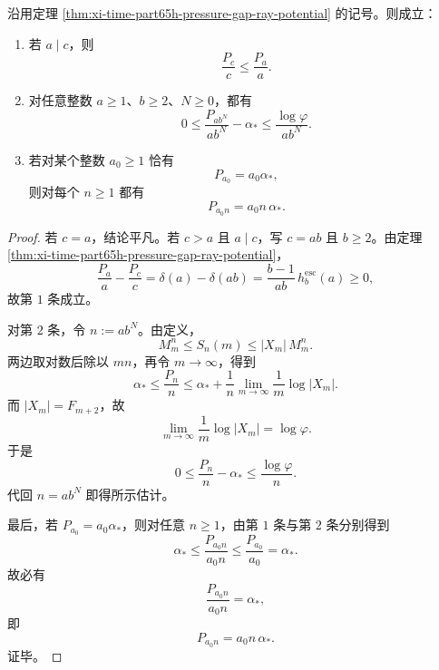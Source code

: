 \begin{corollary}\label{cor:xi-time-part65h-divisibility-slope-freezing-propagation}
沿用定理 \ref{thm:xi-time-part65h-pressure-gap-ray-potential} 的记号。则成立：
\begin{enumerate}
  \item 若 \(a\mid c\)，则
  \[
  \frac{P_c}{c}\le \frac{P_a}{a}.
  \]
  \item 对任意整数 \(a\ge 1\)、\(b\ge 2\)、\(N\ge 0\)，都有
  \[
  0\le \frac{P_{ab^N}}{ab^N}-\alpha_*
  \le \frac{\log\varphi}{ab^N}.
  \]
  \item 若对某个整数 \(a_0\ge 1\) 恰有
  \[
  P_{a_0}=a_0\alpha_*,
  \]
  则对每个 \(n\ge 1\) 都有
  \[
  P_{a_0n}=a_0n\,\alpha_*.
  \]
\end{enumerate}
\end{corollary}
\begin{proof}
若 \(c=a\)，结论平凡。若 \(c>a\) 且 \(a\mid c\)，写 \(c=ab\) 且 \(b\ge 2\)。由定理 \ref{thm:xi-time-part65h-pressure-gap-ray-potential}，
\[
\frac{P_a}{a}-\frac{P_c}{c}
=
\delta(a)-\delta(ab)
=
\frac{b-1}{ab}\,h_b^{\mathrm{esc}}(a)\ge 0,
\]
故第 \(1\) 条成立。

对第 \(2\) 条，令 \(n:=ab^N\)。由定义，
\[
M_m^n\le S_n(m)\le |X_m|\,M_m^n.
\]
两边取对数后除以 \(mn\)，再令 \(m\to\infty\)，得到
\[
\alpha_*\le \frac{P_n}{n}\le \alpha_*+\frac{1}{n}\lim_{m\to\infty}\frac1m\log|X_m|.
\]
而 \(|X_m|=F_{m+2}\)，故
\[
\lim_{m\to\infty}\frac1m\log|X_m|=\log\varphi.
\]
于是
\[
0\le \frac{P_n}{n}-\alpha_*\le \frac{\log\varphi}{n}.
\]
代回 \(n=ab^N\) 即得所示估计。

最后，若 \(P_{a_0}=a_0\alpha_*\)，则对任意 \(n\ge 1\)，由第 \(1\) 条与第 \(2\) 条分别得到
\[
\alpha_*\le \frac{P_{a_0n}}{a_0n}\le \frac{P_{a_0}}{a_0}=\alpha_*.
\]
故必有
\[
\frac{P_{a_0n}}{a_0n}=\alpha_*,
\]
即
\[
P_{a_0n}=a_0n\,\alpha_*.
\]
证毕。
\end{proof}

